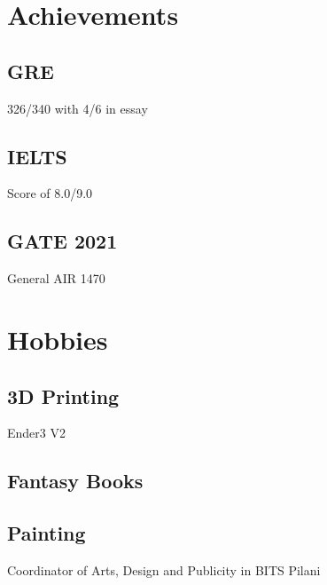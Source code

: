\documentclass[]{plushcv}
\begin{document}
\begin{minipage}[t]{0.2\textwidth}
\vspace{-0.375cm}
\section{Achievements}
\vspace{-0.375cm}
\subsection{GRE}
326/340 with 4/6 in essay \\
\sectionsep
\subsection{IELTS}
Score of 8.0/9.0 \\
\sectionsep
\subsection{GATE 2021}
General AIR 1470 \\
\vspace{-0.1cm}


\section{Hobbies}
\vspace{-0.375cm}
\subsection{3D Printing}
Ender3 V2
\sectionsep
\subsection{Fantasy Books}
\sectionsep
\subsection{Painting}
Coordinator of Arts, Design and Publicity in BITS Pilani
\end{minipage} 
\end{document}
